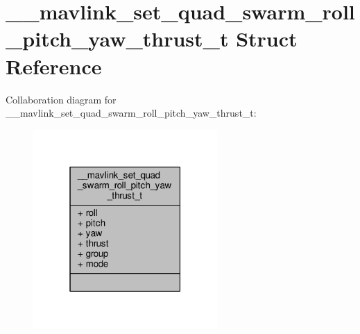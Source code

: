 \hypertarget{struct____mavlink__set__quad__swarm__roll__pitch__yaw__thrust__t}{\section{\+\_\+\+\_\+mavlink\+\_\+set\+\_\+quad\+\_\+swarm\+\_\+roll\+\_\+pitch\+\_\+yaw\+\_\+thrust\+\_\+t Struct Reference}
\label{struct____mavlink__set__quad__swarm__roll__pitch__yaw__thrust__t}
}


Collaboration diagram for \+\_\+\+\_\+mavlink\+\_\+set\+\_\+quad\+\_\+swarm\+\_\+roll\+\_\+pitch\+\_\+yaw\+\_\+thrust\+\_\+t\+:
\nopagebreak
\begin{figure}[H]
\begin{center}
\leavevmode
\includegraphics[width=199pt]{struct____mavlink__set__quad__swarm__roll__pitch__yaw__thrust__t__coll__graph}
\end{center}
\end{figure}
